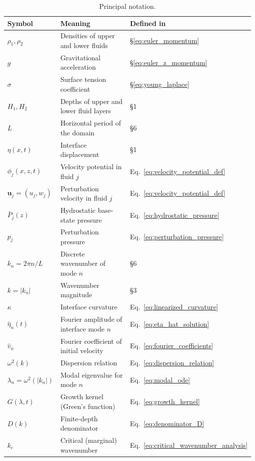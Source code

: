 \documentclass[11pt,a4paper]{article}
\begin{document}
\begin{table}[ht]
\centering
\caption{Principal notation.}
\label{tab:notation}
\small
\begin{tabular}{lll}
\hline
\textbf{Symbol} & \textbf{Meaning} & \textbf{Defined in} \\
\hline
$\rho_1,\rho_2$ & Densities of upper and lower fluids & \S\ref{eq:euler_momentum} \\
$g$ & Gravitational acceleration & \S\ref{eq:euler_z_momentum} \\
$\sigma$ & Surface tension coefficient & \S\ref{eq:young_laplace} \\
$H_1,H_2$ & Depths of upper and lower fluid layers & \S1 \\
$L$ & Horizontal period of the domain & \S6 \\
$\eta(x,t)$ & Interface displacement & \S1 \\
$\phi_j(x,z,t)$ & Velocity potential in fluid $j$ & Eq.~\eqref{eq:velocity_potential_def} \\
$\bm{u}_j=(u_j,w_j)$ & Perturbation velocity in fluid $j$ & Eq.~\eqref{eq:velocity_potential_def} \\
$\bar{P}_j(z)$ & Hydrostatic base-state pressure & Eq.~\eqref{eq:hydrostatic_pressure} \\
$p_j$ & Perturbation pressure & Eq.~\eqref{eq:perturbation_pressure} \\
$k_n=2\pi n/L$ & Discrete wavenumber of mode $n$ & \S6 \\
$k=|k_n|$ & Wavenumber magnitude & \S3 \\
$\kappa$ & Interface curvature & Eq.~\eqref{eq:linearized_curvature} \\
$\widehat{\eta}_n(t)$ & Fourier amplitude of interface mode $n$ & Eq.~\eqref{eq:eta_hat_solution} \\
$\widehat{v}_n$ & Fourier coefficient of initial velocity & Eq.~\eqref{eq:fourier_coefficients} \\
$\omega^2(k)$ & Dispersion relation & Eq.~\eqref{eq:dispersion_relation} \\
$\lambda_n=\omega^2(|k_n|)$ & Modal eigenvalue for mode $n$ & Eq.~\eqref{eq:modal_ode} \\
$G(\lambda,t)$ & Growth kernel (Green's function) & Eq.~\eqref{eq:growth_kernel} \\
$D(k)$ & Finite-depth denominator & Eq.~\eqref{eq:denominator_D} \\
$k_c$ & Critical (marginal) wavenumber & Eq.~\eqref{eq:critical_wavenumber_analysis} \\

\end{tabular}
\end{table}
\end{document}
